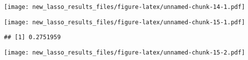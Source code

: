 \documentclass[
]{article}
\newenvironment{Shaded}{\begin{snugshade}}{\end{snugshade}}
\newcommand{\DataTypeTok}[1]{\textcolor[rgb]{0.13,0.29,0.53}{#1}}
\newcommand{\KeywordTok}[1]{\textcolor[rgb]{0.13,0.29,0.53}{\textbf{#1}}}
\newcommand{\NormalTok}[1]{#1}
\newcommand{\OperatorTok}[1]{\textcolor[rgb]{0.81,0.36,0.00}{\textbf{#1}}}
\newcommand{\StringTok}[1]{\textcolor[rgb]{0.31,0.60,0.02}{#1}}
\begin{document}
\texttt{[image: new\_lasso\_results\_files/figure-latex/unnamed-chunk-14-1.pdf]}

\begin{Shaded}
\end{Shaded}

\texttt{[image: new\_lasso\_results\_files/figure-latex/unnamed-chunk-15-1.pdf]}

\begin{Shaded}
\end{Shaded}

\begin{verbatim}
## [1] 0.2751959
\end{verbatim}

\begin{Shaded}
\end{Shaded}

\texttt{[image: new\_lasso\_results\_files/figure-latex/unnamed-chunk-15-2.pdf]}

\begin{Shaded}
\end{Shaded}
\end{document}
